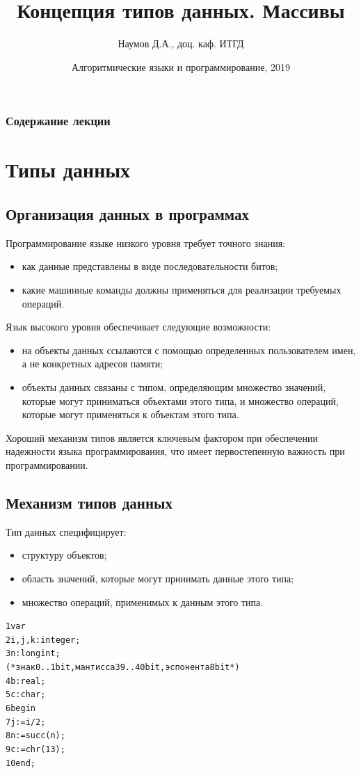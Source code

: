 \documentclass{beamer}
\title[Массивы]{Концепция типов данных. Массивы}
\author{Наумов Д.А., доц. каф. ИТГД}
\date[11.02.2019] {Алгоритмические языки и программирование, 2019}
\begin{document}
\begin{frame}
  \titlepage
\end{frame}
  
\begin{frame}
  \frametitle{Содержание лекции}
  \tableofcontents  
\end{frame}
  
\section{Типы данных}

\subsection{Организация данных в программах}
\begin{frame}[t]
Программирование языке низкого уровня требует точного знания: 
\begin{itemize}
\item как данные представлены в виде последовательности битов;
\item какие машинные команды должны применяться для реализации требуемых операций.
\end{itemize}
Язык высокого уровня обеспечивает следующие возможности:
\begin{itemize}
\item на объекты данных ссылаются с помощью определенных пользователем имен, а не конкретных адресов памяти;
\item объекты данных связаны с типом, определяющим множество значений, которые могут приниматься объектами этого типа, и множество операций, которые могут применяться к объектам этого типа.
\end{itemize}
Хороший механизм типов является ключевым фактором при обеспечении
надежности языка программирования, что имеет первостепенную важность при программировании.
\end{frame} 

\subsection{Механизм типов данных}
\begin{frame}[fragile]
Тип данных специфицирует:
\begin{itemize}
\item структуру объектов;
\item область значений, которые могут принимать данные этого типа;
\item множество операций, применимых к данным этого типа. 
\end{itemize}
\begin{alltt}
1  var
2    i, j, k: integer;
3    n: longint;
(*  знак 0..1 bit, мантисса 39..40 bit, эспонента 8 bit  *)
4    b: real;  
5    c: char;
6  begin
7    j := i / 2;
8    n := succ(n);
9    c := chr(13);
10 end;
\end{alltt}
\end{frame}
   
\end{document}
